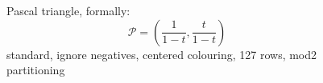 

\begin{figure}[p]

    \noindent{}

    \captionsetup{singlelinecheck=off}
    \caption[$\mathcal{P}_{\equiv_{2}}$]{
        Pascal triangle, formally: 
        \begin{displaymath}
            \mathcal{P}=\left(\frac{1}{1-t}, \frac{t}{1-t}\right)
        \end{displaymath} %
        standard, ignore negatives, centered colouring, 127 rows, mod2 partitioning}

    \label{fig:pascal-standard-ignore-negatives-centered-colouring-127-rows-mod2-partitioning-triangle}

\end{figure}
